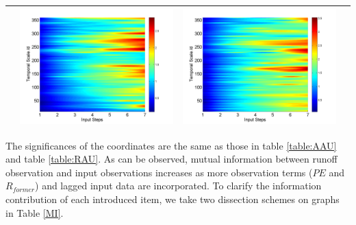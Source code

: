 \documentclass[draft,wrr]{AGUTeX}
\begin{document}
\begin{article}
\begin{table}[H]
\begin{tabular}{cccc}
&\begin{minipage}{.3\textwidth}\includegraphics[width=\linewidth]{resultgraph/06810000pep.png}\end{minipage}
&\begin{minipage}{.3\textwidth}\includegraphics[width=\linewidth]{resultgraph/06810000pepq.png}\end{minipage}
\\
\hline
\end{tabular}
\end{table}
The significances of the coordinates are the same as those in table \ref{table:AAU}
and table \ref{table:RAU}. As can be observed, mutual information between runoff observation and input observations increases as more observation terms ($PE$ and $R_{former}$) and lagged input data are incorporated. To clarify the information contribution of each introduced item, 
we take two dissection schemes on graphs in Table \ref{MI}.

\end{article}
\end{document}
